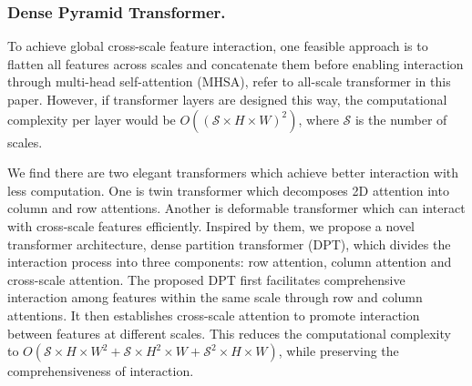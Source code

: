 \documentclass[sigconf]{acmart}
\begin{document}
\subsubsection{Dense Pyramid Transformer.}
To achieve global cross-scale feature interaction, one feasible approach is to flatten all features across scales and concatenate them before enabling interaction through multi-head self-attention (MHSA), refer to all-scale transformer in this paper. However, if transformer layers are designed this way, the computational complexity per layer would be $O((\mathcal{S}\times H\times W)^2)$, where $\mathcal{S}$ is the number of scales.

We find there are two elegant transformers which achieve better interaction with less computation. One is twin transformer \cite{guo2021sotr} which decomposes 2D attention into column and row attentions. Another is deformable transformer \cite{zhu2020deformable} which can interact with cross-scale features efficiently. Inspired by them, we propose a novel transformer architecture, dense partition transformer (DPT), which divides the interaction process into three components: row attention, column attention and cross-scale attention. The proposed DPT first facilitates comprehensive interaction among features within the same scale through row and column attentions. It then establishes cross-scale attention to promote interaction between features at different scales. This reduces the computational complexity to $O(\mathcal{S}\times H\times W^2 + \mathcal{S}\times H^2\times W+\mathcal{S}^2\times H\times W) $, while preserving the comprehensiveness of interaction.
\end{document}
